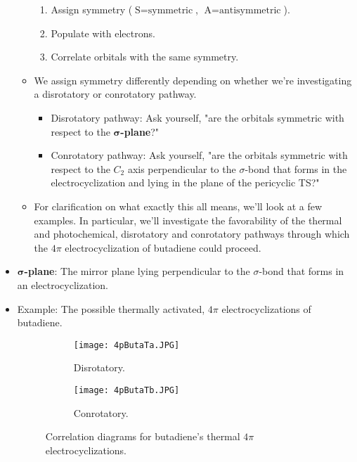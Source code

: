 \documentclass[../notes.tex]{subfiles}
\begin{document}
\begin{itemize}
\begin{itemize}
\begin{enumerate}
            \item Assign symmetry ($\text{S}=\text{symmetric}$, $\text{A}=\text{antisymmetric}$).
            \item Populate with electrons.
            \item Correlate orbitals with the same symmetry.
        \end{enumerate}
        \item We assign symmetry differently depending on whether we're investigating a disrotatory or conrotatory pathway.
        \begin{itemize}
            \item Disrotatory pathway: Ask yourself, "are the orbitals symmetric with respect to the \textbf{$\bm{\sigma}$-plane}?"
            \item Conrotatory pathway: Ask yourself, "are the orbitals symmetric with respect to the $C_2$ axis perpendicular to the $\sigma$-bond that forms in the electrocyclization and lying in the plane of the pericyclic TS?"
        \end{itemize}
        \item For clarification on what exactly this all means, we'll look at a few examples. In particular, we'll investigate the favorability of the thermal and photochemical, disrotatory and conrotatory pathways through which the $4\pi$ electrocyclization of butadiene could proceed.
    \end{itemize}
    \item \textbf{$\bm{\sigma}$-plane}: The mirror plane lying perpendicular to the $\sigma$-bond that forms in an electrocyclization.
    \item Example: The possible thermally activated, $4\pi$ electrocyclizations of butadiene.
    \begin{figure}[h!]
        \centering
        \begin{subfigure}[b]{0.4\linewidth}
            \centering
            \texttt{[image: 4pButaTa.JPG]}
            \caption{Disrotatory.}
            \label{fig:4pButaTa}
        \end{subfigure}
        \begin{subfigure}[b]{0.222\linewidth}
            \centering
            \texttt{[image: 4pButaTb.JPG]}
            \caption{Conrotatory.}
            \label{fig:4pButaTb}
        \end{subfigure}
        \caption{Correlation diagrams for butadiene's thermal $4\pi$ electrocyclizations.}
        \label{fig:4pButaT}

\end{figure}
\end{itemize}
\end{document}
